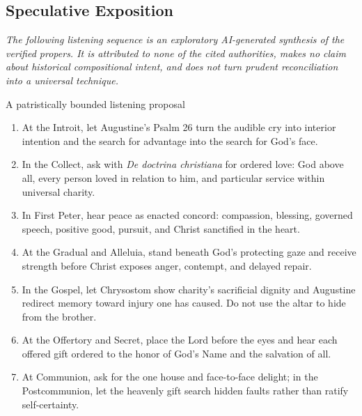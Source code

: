 \begin{deepstudy}
\section*{Speculative Exposition}

\noindent\emph{The following listening sequence is an exploratory AI-generated synthesis of the verified propers. It is attributed to none of the cited authorities, makes no claim about historical compositional intent, and does not turn prudent reconciliation into a universal technique.}

\begin{massbox}{A patristically bounded listening proposal\enspace{}}
\begin{enumerate}[leftmargin=1.45em,itemsep=0.2em]
\item At the Introit, let Augustine's Psalm 26 turn the audible cry into interior intention and the search for advantage into the search for God's face.
\item In the Collect, ask with \emph{De doctrina christiana} for ordered love: God above all, every person loved in relation to him, and particular service within universal charity.
\item In First Peter, hear peace as enacted concord: compassion, blessing, governed speech, positive good, pursuit, and Christ sanctified in the heart.
\item At the Gradual and Alleluia, stand beneath God's protecting gaze and receive strength before Christ exposes anger, contempt, and delayed repair.
\item In the Gospel, let Chrysostom show charity's sacrificial dignity and Augustine redirect memory toward injury one has caused. Do not use the altar to hide from the brother.
\item At the Offertory and Secret, place the Lord before the eyes and hear each offered gift ordered to the honor of God's Name and the salvation of all.
\item At Communion, ask for the one house and face-to-face delight; in the Postcommunion, let the heavenly gift search hidden faults rather than ratify self-certainty.
\end{enumerate}
\end{massbox}


\end{deepstudy}
